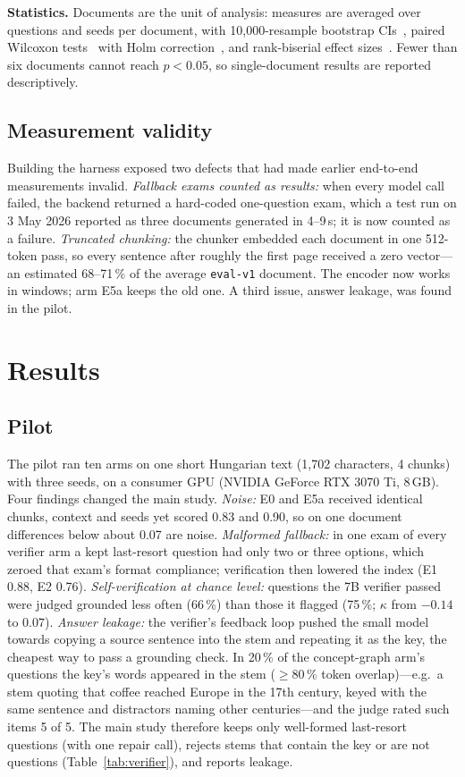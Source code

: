 \documentclass[conference]{IEEEtran}
\begin{document}
\textbf{Statistics.} Documents are the unit of analysis: measures are averaged over questions and seeds
per document, with 10{,}000-resample bootstrap CIs~\cite{efron1993}, paired Wilcoxon
tests~\cite{wilcoxon1945} with Holm correction~\cite{holm1979}, and rank-biserial effect
sizes~\cite{kerby2014}. Fewer than six documents cannot reach $p<0.05$, so single-document results are
reported descriptively.

\subsection{Measurement validity}
\label{sec:validity}

Building the harness exposed two defects that had made earlier end-to-end measurements invalid.
\emph{Fallback exams counted as results:} when every model call failed, the backend returned a
hard-coded one-question exam, which a test run on 3 May 2026 reported as three documents generated in
4--9\,s; it is now counted as a failure. \emph{Truncated chunking:} the chunker embedded each document in
one 512-token pass, so every sentence after roughly the first page received a zero vector---an estimated
68--71\,\% of the average \texttt{eval-v1} document. The encoder now works in windows; arm E5a keeps the
old one. A third issue, answer leakage, was found in the pilot.

\section{Results}
\label{sec:results}

\subsection{Pilot}

The pilot ran ten arms on one short Hungarian text (1{,}702 characters, 4 chunks) with three seeds,
on a consumer GPU (NVIDIA GeForce RTX 3070 Ti, 8\,GB). Four findings changed the main study.
\emph{Noise:} E0 and E5a received identical chunks, context and seeds yet scored 0.83 and 0.90, so on one
document differences below about 0.07 are noise. \emph{Malformed fallback:} in one exam of every verifier
arm a kept last-resort question had only two or three options, which zeroed that exam's format compliance;
verification then lowered the index (E1 0.88, E2 0.76). \emph{Self-verification at chance level:}
questions the 7B verifier passed were judged grounded less often (66\,\%) than those it flagged (75\,\%;
$\kappa$ from $-0.14$ to $0.07$). \emph{Answer leakage:} the verifier's feedback loop pushed the small
model towards copying a source sentence into the stem and repeating it as the key, the cheapest way to pass
a grounding check. In 20\,\% of the concept-graph arm's questions the key's words appeared in the stem
($\ge$80\,\% token overlap)---e.g.\ a stem quoting that coffee reached Europe in the 17th century, keyed
with the same sentence and distractors naming other centuries---and the judge rated such items 5 of 5. The main study
therefore keeps only well-formed last-resort questions (with one repair call), rejects stems that contain
the key or are not questions (Table~\ref{tab:verifier}), and reports leakage.
\end{document}
